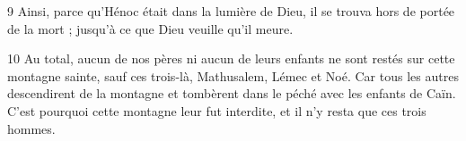 \par 9 Ainsi, parce qu'Hénoc était dans la lumière de Dieu, il se trouva hors de portée de la mort ; jusqu'à ce que Dieu veuille qu'il meure.

\par 10 Au total, aucun de nos pères ni aucun de leurs enfants ne sont restés sur cette montagne sainte, sauf ces trois-là, Mathusalem, Lémec et Noé. Car tous les autres descendirent de la montagne et tombèrent dans le péché avec les enfants de Caïn. C'est pourquoi cette montagne leur fut interdite, et il n'y resta que ces trois hommes.


